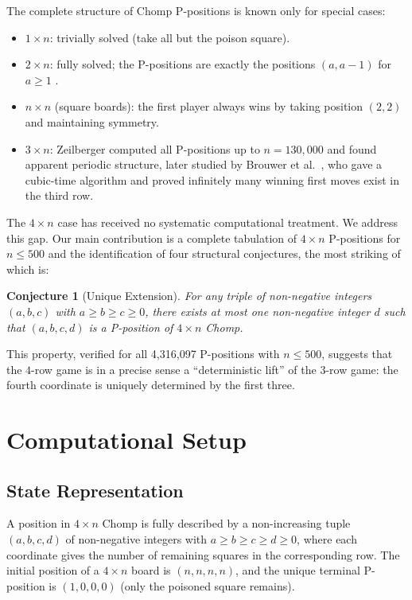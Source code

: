 \documentclass[12pt]{article}
\newtheorem{conjecture}{Conjecture}
\begin{document}
The complete structure of Chomp P-positions is known only for special
cases:
\begin{itemize}
  \item $1 \times n$: trivially solved (take all but the poison square).
  \item $2 \times n$: fully solved; the P-positions are exactly the
        positions $(a, a-1)$ for $a \geq 1$ \cite{berlekamp2001}.
  \item $n \times n$ (square boards): the first player always wins by
        taking position $(2,2)$ and maintaining symmetry.
  \item $3 \times n$: Zeilberger \cite{zeilberger2001} computed all
        P-positions up to $n = 130{,}000$ and found apparent periodic
        structure, later studied by Brouwer et al.\ \cite{brouwer2005},
        who gave a cubic-time algorithm and proved infinitely many
        winning first moves exist in the third row.
\end{itemize}

The $4 \times n$ case has received no systematic computational treatment.
We address this gap. Our main contribution is a complete tabulation of
$4 \times n$ P-positions for $n \leq 500$ and the identification of
four structural conjectures, the most striking of which is:

\begin{conjecture}[Unique Extension]
For any triple of non-negative integers $(a, b, c)$ with $a \geq b
\geq c \geq 0$, there exists \emph{at most one} non-negative integer
$d$ such that $(a, b, c, d)$ is a P-position of $4 \times n$ Chomp.
\end{conjecture}

This property, verified for all 4,316,097 P-positions with $n \leq 500$,
suggests that the $4$-row game is in a precise sense a ``deterministic
lift'' of the $3$-row game: the fourth coordinate is uniquely determined
by the first three.

\section{Computational Setup}

\subsection{State Representation}

A position in $4 \times n$ Chomp is fully described by a non-increasing
tuple $(a, b, c, d)$ of non-negative integers with $a \geq b \geq c
\geq d \geq 0$, where each coordinate gives the number of remaining
squares in the corresponding row. The initial position of a $4 \times n$
board is $(n, n, n, n)$, and the unique terminal P-position is
$(1, 0, 0, 0)$ (only the poisoned square remains).
\end{document}
